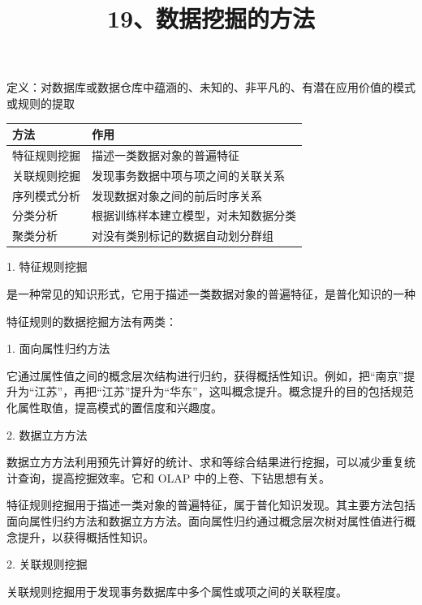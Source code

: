 \documentclass[UTF8,zihao=-4]{ctexart}
\begin{document}
\title{19、数据挖掘的方法}
\author{}
\date{}
\maketitle

定义：对数据库或数据仓库中蕴涵的、未知的、非平凡的、有潜在应用价值的模式或规则的提取\par

\begin{tabularx}{\linewidth}{|*{2}{>{\RaggedRight\arraybackslash}X|}}
\hline
方法 & 作用 \\
\hline
特征规则挖掘 & 描述一类数据对象的普遍特征 \\
\hline
关联规则挖掘 & 发现事务数据中项与项之间的关联关系 \\
\hline
序列模式分析 & 发现数据对象之间的前后时序关系 \\
\hline
分类分析 & 根据训练样本建立模型，对未知数据分类 \\
\hline
聚类分析 & 对没有类别标记的数据自动划分群组 \\
\hline
\end{tabularx}

1. 特征规则挖掘\par
是一种常见的知识形式，它用于描述一类数据对象的普遍特征，是普化知识的一种\par

特征规则的数据挖掘方法有两类：\par

1. 面向属性归约方法\par

它通过属性值之间的概念层次结构进行归约，获得概括性知识。例如，把“南京”提升为“江苏”，再把“江苏”提升为“华东”，这叫概念提升。概念提升的目的包括规范化属性取值，提高模式的置信度和兴趣度。\par

2. 数据立方方法\par

数据立方方法利用预先计算好的统计、求和等综合结果进行挖掘，可以减少重复统计查询，提高挖掘效率。它和 OLAP 中的上卷、下钻思想有关。\par

特征规则挖掘用于描述一类对象的普遍特征，属于普化知识发现。其主要方法包括面向属性归约方法和数据立方方法。面向属性归约通过概念层次树对属性值进行概念提升，以获得概括性知识。\par

2. 关联规则挖掘\par

关联规则挖掘用于发现事务数据库中多个属性或项之间的关联程度。\par
\end{document}
